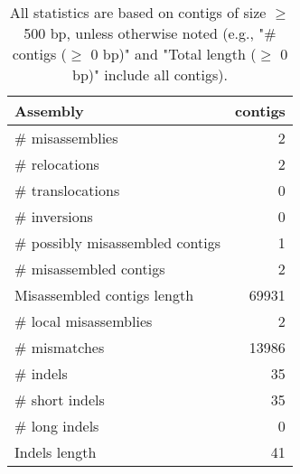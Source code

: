 \documentclass[12pt,a4paper]{article}
\begin{document}
\begin{table}[ht]
\begin{center}
\caption{All statistics are based on contigs of size $\geq$ 500 bp, unless otherwise noted (e.g., "\# contigs ($\geq$ 0 bp)" and "Total length ($\geq$ 0 bp)" include all contigs).}
\begin{tabular}{|l*{1}{|r}|}
\hline
Assembly & contigs \\ \hline
\# misassemblies & 2 \\ \hline
\hspace{5mm}\# relocations & 2 \\ \hline
\hspace{5mm}\# translocations & 0 \\ \hline
\hspace{5mm}\# inversions & 0 \\ \hline
\# possibly misassembled contigs & 1 \\ \hline
\# misassembled contigs & 2 \\ \hline
Misassembled contigs length & 69931 \\ \hline
\# local misassemblies & 2 \\ \hline
\# mismatches & 13986 \\ \hline
\# indels & 35 \\ \hline
\hspace{5mm}\# short indels & 35 \\ \hline
\hspace{5mm}\# long indels & 0 \\ \hline
Indels length & 41 \\ \hline
\end{tabular}
\end{center}
\end{table}
\end{document}
